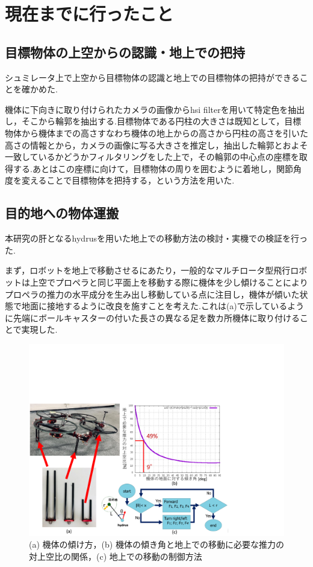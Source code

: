 \documentclass[twocolumn]{preport}
\begin{document}
\section{現在までに行ったこと}
\subsection{目標物体の上空からの認識・地上での把持}
シュミレータ上で上空から目標物体の認識と地上での目標物体の把持ができることを確かめた.

機体に下向きに取り付けられたカメラの画像からhsi filterを用いて特定色を抽出し，そこから輪郭を抽出する.目標物体である円柱の大きさは既知として，目標物体から機体までの高さすなわち機体の地上からの高さから円柱の高さを引いた高さの情報とから，カメラの画像に写る大きさを推定し，抽出した輪郭とおよそ一致しているかどうかフィルタリングをした上で，その輪郭の中心点の座標を取得する.あとはこの座標に向けて，目標物体の周りを囲むように着地し，関節角度を変えることで目標物体を把持する，という方法を用いた.

\subsection{目的地への物体運搬}
本研究の肝となるhydrusを用いた地上での移動方法の検討・実機での検証を行った.

まず，ロボットを地上で移動させるにあたり，一般的なマルチロータ型飛行ロボットは上空でプロペラと同じ平面上を移動する際に機体を少し傾けることによりプロペラの推力の水平成分を生み出し移動している点に注目し，機体が傾いた状態で地面に接地するように改良を施すことを考えた.これは(a)で示しているように先端にボールキャスターの付いた長さの異なる足を数カ所機体に取り付けることで実現した.

\begin{figure}[ht]
  \begin{center}
    \includegraphics[clip,  bb= 0 0 564 374, width=0.9\columnwidth]{figs/ground_motion.pdf}
  \end{center}
  \vspace{-5mm}
    \caption{(a) 機体の傾け方，(b) 機体の傾き角と地上での移動に必要な推力の対上空比の関係，(c) 地上での移動の制御方法}
    \label{figure:ground_mode}
\end{figure}
\end{document}
